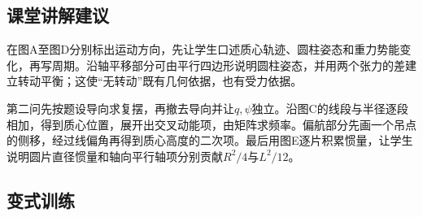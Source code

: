 \documentclass[UTF8,fontset=fandol,a4paper,11pt]{ctexart}
\begin{document}


\subsection*{课堂讲解建议}

在图A至图D分别标出运动方向，先让学生口述质心轨迹、圆柱姿态和重力势能变化，再写周期。沿轴平移部分可由平行四边形说明圆柱姿态，并用两个张力的差建立转动平衡；这使“无转动”既有几何依据，也有受力依据。

第二问先按题设导向求复摆，再撤去导向并让$q,\psi$独立。沿图C的线段与半径逐段相加，得到质心位置，展开出交叉动能项，由矩阵求频率。偏航部分先画一个吊点的侧移，经过线偏角再得到质心高度的二次项。最后用图E逐片积累惯量，让学生说明圆片直径惯量和轴向平行轴项分别贡献$R^2/4$与$L^2/12$。



\subsection*{变式训练}
\end{document}
